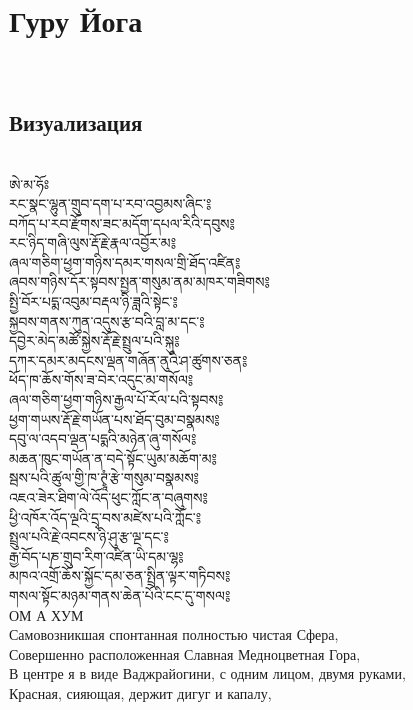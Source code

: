 \section{Гуру Йога}
\\
\subsection{Визуализация}
\\
\ti
ཨེ་མ་ཧོཿ \\
རང་སྣང་ལྷུན་གྲུབ་དག་པ་རབ་འབྱམས་ཞིང་༔ \\
བཀོད་པ་རབ་རྫོགས་ཟང་མདོག་དཔལ་རིའི་དབུས༔\\
རང་ཉིད་གཞི་ལུས་རྡོ་རྗེ་རྣལ་འབྱོར་མ༔\\
ཞལ་གཅིག་ཕྱག་གཉིས་དམར་གསལ་གྲི་ཐོད་འཛིན༔\\
ཞབས་གཉིས་དོར་སྟབས་སྤྱན་གསུམ་ནམ་མཁར་གཟིགས༔\\
སྤྱི་བོར་པདྨ་འབུམ་བརྡལ་ཉི་ཟླའི་སྟེང་༔\\
སྐྱབས་གནས་ཀུན་འདུས་རྩ་བའི་བླ་མ་དང་༔\\
དབྱེར་མེད་མཚོ་སྐྱེས་རྡོ་རྗེ་སྤྲུལ་པའི་སྐུ༔\\
དཀར་དམར་མདངས་ལྡན་གཞོན་ནུའི་ཤ་ཚུགས་ཅན༔\\
ཕོད་ཁ་ཆོས་གོས་ཟ་བེར་འདུང་མ་གསོལ༔\\
ཞལ་གཅིག་ཕྱག་གཉིས་རྒྱལ་པོ་རོལ་པའི་སྟབས༔\\
ཕྱག་གཡས་རྡོ་རྗེ་གཡོན་པས་ཐོད་བུམ་བསྣམས༔\\
དབུ་ལ་འདབ་ལྡན་པདྨའི་མཉེན་ཞུ་གསོལ༔\\
མཆན་ཁུང་གཡོན་ན་བདེ་སྟོང་ཡུམ་མཆོག་མ༔\\
སྦས་པའི་ཚུལ་གྱི་ཁ་ཊྭཱཾ་རྩེ་གསུམ་བསྣམས༔\\
འཇའ་ཟེར་ཐིག་ལེ་འོད་ཕུང་ཀློང་ན་བཞུགས༔\\
ཕྱི་འཁོར་འོད་ལྔའི་དྲྭ་བས་མཛེས་པའི་ཀློང་༔\\
སྤྲུལ་པའི་རྗེ་འབངས་ཉི་ཤུ་རྩ་ལྔ་དང་༔\\
རྒྱ་བོད་པཎ་གྲུབ་རིག་འཛིན་ཡི་དམ་ལྷ༔\\
མཁའ་འགྲོ་ཆོས་སྐྱོང་དམ་ཅན་སྤྲིན་ལྟར་གཏིབས༔\\
གསལ་སྟོང་མཉམ་གནས་ཆེན་པོའི་ངང་དུ་གསལ༔\\
\ru
\newpage
ОМ А ХУМ\\
Самовозникшая спонтанная полностью чистая Сфера,\\
Совершенно расположенная Славная Медноцветная Гора, \\
В центре я в виде Ваджрайогини, с одним лицом, двумя руками,\\
Красная, сияющая, держит дигуг и капалу,\\
